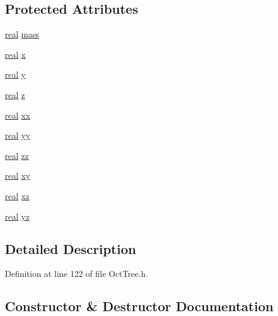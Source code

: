 \subsection*{Protected Attributes}
\begin{DoxyCompactItemize}
\item 
\hyperlink{Global_8h_a031f8951175b43076c2084a6c2173410}{real} \hyperlink{classPseudoBody_a677f435d37ab821051acc8782fe87d28}{mass}
\item 
\hyperlink{Global_8h_a031f8951175b43076c2084a6c2173410}{real} \hyperlink{classPseudoBody_adfb321836fdd97987e0e9f0d16d888f0}{x}
\item 
\hyperlink{Global_8h_a031f8951175b43076c2084a6c2173410}{real} \hyperlink{classPseudoBody_a6b3efb100ca3519c867639235eed21c8}{y}
\item 
\hyperlink{Global_8h_a031f8951175b43076c2084a6c2173410}{real} \hyperlink{classPseudoBody_a525516d0ad812376279295230ea3c0cd}{z}
\item 
\hyperlink{Global_8h_a031f8951175b43076c2084a6c2173410}{real} \hyperlink{classPseudoBody_a052722090eebdb38fb7a19267dd8b6f0}{xx}
\item 
\hyperlink{Global_8h_a031f8951175b43076c2084a6c2173410}{real} \hyperlink{classPseudoBody_a5f48c70435083ed9e70e49bae5d6c062}{yy}
\item 
\hyperlink{Global_8h_a031f8951175b43076c2084a6c2173410}{real} \hyperlink{classPseudoBody_a780383e80d62974388cee24f7c78ad73}{zz}
\item 
\hyperlink{Global_8h_a031f8951175b43076c2084a6c2173410}{real} \hyperlink{classPseudoBody_a3640e978dfc953cf5ed3f27ea99226f7}{xy}
\item 
\hyperlink{Global_8h_a031f8951175b43076c2084a6c2173410}{real} \hyperlink{classPseudoBody_a6d5d2607dc83899e69f7044772662ba8}{xz}
\item 
\hyperlink{Global_8h_a031f8951175b43076c2084a6c2173410}{real} \hyperlink{classPseudoBody_a8ff5cebfd6dbd0ce11474aefe907a7ef}{yz}
\end{DoxyCompactItemize}


\subsection{Detailed Description}


Definition at line 122 of file OctTree.h.



\subsection{Constructor \& Destructor Documentation}
